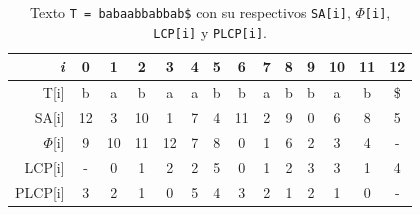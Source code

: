 \begin{table}[h]
\centering
\label{my-label12}
\begin{tabular}{|r|ccccccccccccc|}
\hline
\textit{i}  & \multicolumn{1}{c|}{0} & \multicolumn{1}{c|}{1} & \multicolumn{1}{c|}{2} & \multicolumn{1}{c|}{3} & \multicolumn{1}{c|}{4} & \multicolumn{1}{c|}{5} & \multicolumn{1}{c|}{6} & \multicolumn{1}{c|}{7} & \multicolumn{1}{c|}{8} & \multicolumn{1}{c|}{9} & \multicolumn{1}{c|}{10} & \multicolumn{1}{c|}{11} & 12 \\ \hline
T{[}i{]}    & b                      & a                      & b                      & a                      & a                      & b                      & b                      & a                      & b                      & b                      & a                       & b                       & \$  \\
SA{[}i{]}   & 12                     & 3                      & 10                     & 1                      & 7                      & 4                      & 11                     & 2                      & 9                      & 0                      & 6                       & 8                       & 5  \\
$\Phi${[}i{]}  & 9                      & 10                     & 11                     & 12                     & 7                      & 8                      & 0                      & 1                      & 6                      & 2                      & 3                       & 4                       & -  \\
LCP{[}i{]}  & -                      & 0                      & 1                      & 2                      & 2                      & 5                      & 0                      & 1                      & 2                      & 3                      & 3                       & 1                       & 4  \\
PLCP{[}i{]} & 3                      & 2                      & 1                      & 0                      & 5                      & 4                      & 3                      & 2                      & 1                      & 2                      & 1                       & 0                       & -  \\ \hline
\end{tabular}
\caption{Texto \texttt{T = babaabbabbab\$} con su respectivos \texttt{SA[i]}, \texttt{$\Phi$[i]}, \texttt{LCP[i]} y \texttt{PLCP[i]}.}
\end{table}

